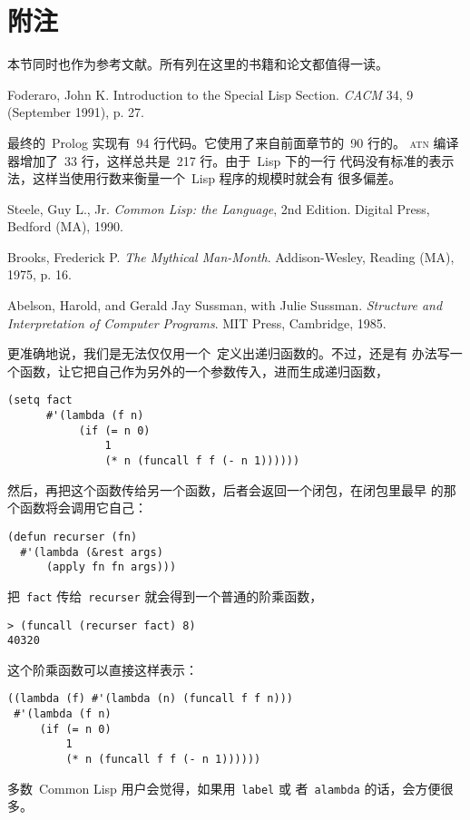
\chapter{附注}
\label{chap:notes}

本节同时也作为参考文献。所有列在这里的书籍和论文都值得一读。

\begin{notes}
  Foderaro, John K. Introduction to the Special Lisp
  Section. \emph{CACM} 34, 9 (September 1991), p. 27.

  最终的~Prolog 实现有~94 行代码。它使用了来自前面章节的~90 行的\utility。
  \textsc{atn} 编译器增加了~33 行，这样总共是~217 行。由于~Lisp 下的一行
  代码没有标准的表示法，这样当使用行数来衡量一个~Lisp 程序的规模时就会有
  很多偏差。

  Steele, Guy L., Jr. \emph{Common Lisp: the Language}, 2nd
  Edition. Digital Press, Bedford (MA), 1990.

  Brooks, Frederick P. \emph{The Mythical Man-Month}. Addison-Wesley,
  Reading (MA), 1975, p. 16.

  Abelson, Harold, and Gerald Jay Sussman, with Julie
  Sussman. \emph{Structure and Interpretation of Computer Programs}. MIT
  Press, Cambridge, 1985.

  更准确地说，我们是无法仅仅用一个~\lexpr{}定义出递归函数的。不过，还是有
  办法写一个函数，让它把自己作为另外的一个参数传入，进而生成递归函数，
\begin{verbatim}
(setq fact
      #'(lambda (f n)
           (if (= n 0)
               1
               (* n (funcall f f (- n 1))))))
\end{verbatim}
  然后，再把这个函数传给另一个函数，后者会返回一个闭包，在闭包里最早
  的那个函数将会调用它自己：

\begin{verbatim}
(defun recurser (fn)
  #'(lambda (&rest args)
      (apply fn fn args)))
\end{verbatim}
  把~\texttt{fact} 传给~\texttt{recurser} 就会得到一个普通的阶乘函数，

\begin{verbatim}
> (funcall (recurser fact) 8)
40320
\end{verbatim}
  这个阶乘函数可以直接这样表示：
\begin{verbatim}
((lambda (f) #'(lambda (n) (funcall f f n)))
 #'(lambda (f n)
     (if (= n 0)
         1
         (* n (funcall f f (- n 1))))))
\end{verbatim}
  多数~Common Lisp 用户会觉得，如果用~\texttt{label} 或
  者~\texttt{alambda} 的话，会方便很多。


\end{notes}
